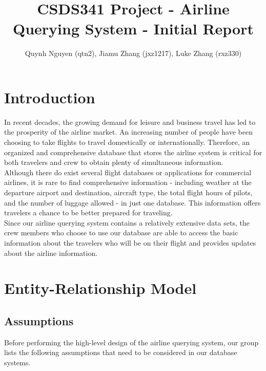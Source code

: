\documentclass{article}
\title{CSDS341 Project - Airline Querying System - Initial Report}
\author{Quynh Nguyen (qtn2), Jiamu Zhang (jxz1217), Luke Zhang (rxz330)}
\begin{document}
	
	
	\maketitle
	
	\section{Introduction}
	
	\noindent In recent decades, the growing demand for leisure and business travel has led to the prosperity of the airline market. An increasing number of people have been choosing to take flights to travel domestically or internationally. Therefore, an organized and comprehensive database that stores the airline system is critical for both travelers and crew to obtain plenty of simultaneous information.\\
	
	\noindent Although there do exist several flight databases or applications for commercial airlines, it is rare to find comprehensive information - including weather at the departure airport and destination, aircraft type, the total flight hours of pilots, and the number of luggage allowed - in just one database. This information offers travelers a chance to be better prepared for traveling.\\
	
	\noindent Since our airline querying system contains a relatively extensive data sets, the crew members who choose to use our database are able to access the basic information about the travelers who will be on their flight and provides updates about the airline information. 
	
	\section{Entity-Relationship Model}
	
	\subsection{Assumptions}
	{Before performing the high-level design of the airline querying system, our group lists the following assumptions that need to be considered in our database systems.}
	
\end{document}
